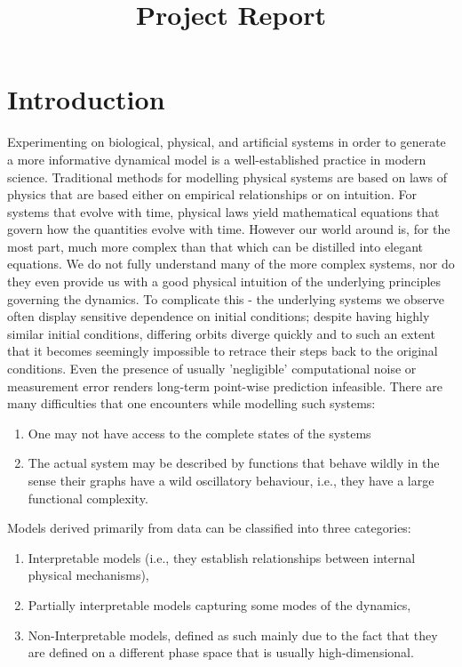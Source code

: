 \documentclass[a4paper,12pt,twoside]{report}
\begin{document}
\title{Project Report}



\author{} 
\date{}
\date{}
\maketitle
\tableofcontents


\chapter{Introduction}\label{ch1}

Experimenting on biological, physical, and artificial systems in order to generate a more informative dynamical model is a well-established practice in modern science. Traditional methods for modelling physical systems are based on laws of physics that are based either on empirical relationships or on intuition. For systems that evolve with time, physical laws yield mathematical equations that govern how the quantities evolve with time. However our world around is, for the most part, much more complex than that which can be distilled into elegant equations. We do not fully understand many of the more complex systems, nor do they even provide us with a good physical intuition of the underlying principles governing the dynamics. 
To complicate this - the underlying systems we observe often display sensitive dependence on initial conditions; despite having highly similar initial conditions, differing orbits diverge quickly and to such an extent that it becomes seemingly impossible to retrace their steps back to the original conditions. Even the presence of usually 'negligible' computational noise or measurement error renders long-term point-wise prediction infeasible. 
There are many difficulties that one encounters while modelling such systems:
\vspace{-8mm}
\begin{enumerate}[noitemsep, label=\roman*.]
  \item One may not have access to the complete states of the systems
  \item The actual system may be described by functions that behave wildly in the sense their graphs have a wild oscillatory behaviour, i.e., they have a large functional complexity.    
\end{enumerate}


Models derived primarily from data can be classified into three categories: 
\vspace{-8mm}
\begin{enumerate}[noitemsep, label=\roman*.]
  \item  Interpretable models (i.e., they establish relationships between internal physical mechanisms), 
  \item Partially interpretable models capturing some modes of the dynamics, 
  \item Non-Interpretable models, defined as such mainly due to the fact that they are defined on a different phase space that is usually high-dimensional. 
\end{enumerate}
\end{document}
